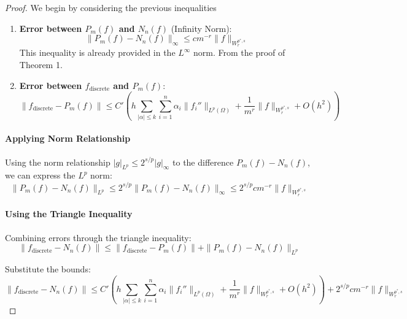 \documentclass[11pt,a4paper]{article}
\theoremstyle{plain}
\theoremstyle{definition}
\theoremstyle{remark}
\begin{document}


\begin{proof}
    We begin by considering the previous inequalities
\begin{enumerate}
    \item \textbf{Error between \( P_m(f) \) and \( N_n(f) \)} (Infinity Norm):
    \[
    \|P_m(f) - N_n(f)\|_{\infty} \leq cm^{-r} \|f\|_{W^{p^*,s}_r}
    \]
    This inequality is already provided in the \( L^\infty \) norm. From the proof of Theorem 1.

    \item \textbf{Error between \( f_{\text{discrete}} \) and \( P_m(f) \)}:
    \[
    \|f_{\text{discrete}} - P_m(f)\| \leq C' \left( h \sum_{|\alpha| \leq k} \sum_{i=1}^n \alpha_i \|f_i''\|_{L^p(\Omega)} + \frac{1}{m^r} \|f\|_{W^{p^*,s}_r} + O(h^2) \right)
    \]
\end{enumerate}

\paragraph*{Applying Norm Relationship}

Using the norm relationship \( |g|_{L^p} \leq 2^{s/p} |g|_{\infty} \) to the difference \( P_m(f) - N_n(f) \), we can express the \( L^p \) norm:
\[
\|P_m(f) - N_n(f)\|_{L^p} \leq 2^{s/p} \|P_m(f) - N_n(f)\|_{\infty} \leq 2^{s/p} cm^{-r} \|f\|_{W^{p^*,s}_r}
\]

\paragraph*{Using the Triangle Inequality}

Combining errors through the triangle inequality:
\[
\|f_{\text{discrete}} - N_n(f)\| \leq \|f_{\text{discrete}} - P_m(f)\| + \|P_m(f) - N_n(f)\|_{L^p}
\]

Substitute the bounds:
\[
\|f_{\text{discrete}} - N_n(f)\| \leq C' \left( h \sum_{|\alpha| \leq k} \sum_{i=1}^n \alpha_i \|f_i''\|_{L^p(\Omega)} + \frac{1}{m^r} \|f\|_{W^{p^*,s}_r} + O(h^2) \right) + 2^{s/p} cm^{-r} \|f\|_{W^{p^*,s}_r}
\]


\end{proof}
\end{document}
